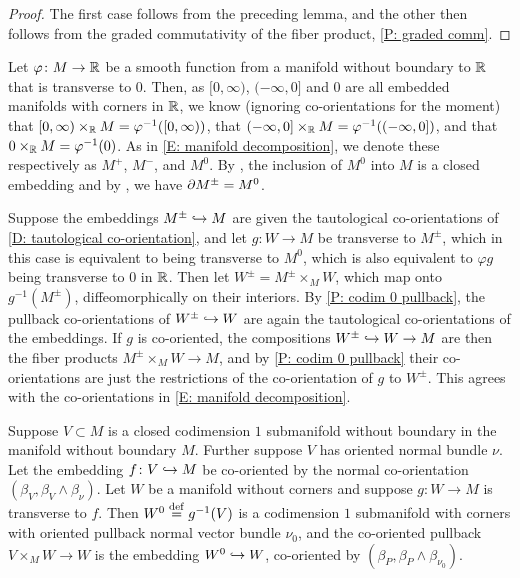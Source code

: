 \begin{proof}
	The first case follows from the preceding lemma, and the other then follows from the graded commutativity of the fiber product, \cref{P: graded comm}.
\end{proof}

\begin{example}\label{E: codim 0 and 1 co-or as fiber products}
	Let $\varphi \colon M \to \mathbb{R}$ be a smooth function from a manifold without boundary to $\mathbb{R}$ that is transverse to $0$.
	Then, as $[0, \infty)$, $(-\infty, 0]$ and $0$ are all embedded manifolds with corners in $\mathbb{R}$, we know (ignoring co-orientations for the moment) that $[0,\infty) \times_{\mathbb{R}} M = \varphi^{-1}([0,\infty))$, that $(-\infty,0] \times_{\mathbb{R}} M = \varphi^{-1}((-\infty,0])$, and that $0 \times_{\mathbb{R}} M = \varphi^{-1}(0)$.
	As in \cref{E: manifold decomposition}, we denote these respectively as $M^+$, $M^-$, and $M^0$.
	By \cite[Proposition 4.2.9]{MaDo92}, the inclusion of $M^0$ into $M$ is a closed embedding and by \cite[Proposition 6.7]{Joy12}, we have $\partial M^\pm = M^0$.

	Suppose the embeddings $M^\pm \hookrightarrow M$ are given the tautological co-orientations of \cref{D: tautological co-orientation}, and let $g \colon W \to M$ be transverse to $M^\pm$, which in this case is equivalent to being transverse to $M^0$, which is also equivalent to $\varphi g$ being transverse to $0$ in $\mathbb{R}$.
	Then let $W^\pm = M^\pm \times_M W$, which map onto $g^{-1}(M^\pm)$, diffeomorphically on their interiors.
	By \cref{P: codim 0 pullback}, the pullback co-orientations of $W^\pm \hookrightarrow W$ are again the tautological co-orientations of the embeddings.
	If $g$ is co-oriented, the compositions $W^\pm \hookrightarrow W \to M$ are then the fiber products $M^\pm \times_M W \to M$, and by \cref{P: codim 0 pullback} their co-orientations are just the restrictions of the co-orientation of $g$ to $W^\pm$.
	This agrees with the co-orientations in \cref{E: manifold decomposition}.
\end{example}

\begin{proposition}\label{P: codim 1 co-orient}
	Suppose $V \subset M$ is a closed codimension $1$ submanifold without boundary in the manifold without boundary $M$.
	Further suppose $V$ has oriented normal bundle $\nu$.
	Let the embedding $f \colon V \hookrightarrow M$ be co-oriented by the normal co-orientation $(\beta_V, \beta_V \wedge \beta_\nu)$.
	Let $W$ be a manifold without corners and suppose $g \colon W \to M$ is transverse to $f$.
	Then $W^0 \stackrel{\mathrm{def}}{=} g^{-1}(V)$ is a codimension $1$ submanifold with corners with oriented pullback normal vector bundle $\nu_0$, and the co-oriented pullback $V \times_M W \to W$ is the embedding $W^0 \hookrightarrow W$, co-oriented by $(\beta_P, \beta_P \wedge \beta_{\nu_0})$.
\end{proposition}

